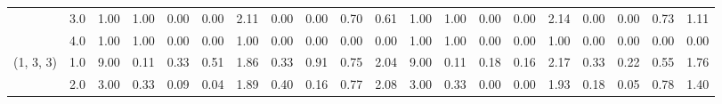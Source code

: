 \begin{tabular}{llrrrrrrrrrrrrrrrrrr}
          & 3.0 &               1.00 &                     1.00 &                                 0.00 &                             0.00 &                           2.11 &                                               0.00 &                                            0.00 &                                            0.70 &                                        0.61 &               1.00 &                     1.00 &                                 0.00 &                             0.00 &                           2.14 &                                               0.00 &                                            0.00 &                                            0.73 &                                        1.11 \\
          & 4.0 &               1.00 &                     1.00 &                                 0.00 &                             0.00 &                           1.00 &                                               0.00 &                                            0.00 &                                            0.00 &                                        0.00 &               1.00 &                     1.00 &                                 0.00 &                             0.00 &                           1.00 &                                               0.00 &                                            0.00 &                                            0.00 &                                        0.00 \\
(1, 3, 3) & 1.0 &               9.00 &                     0.11 &                                 0.33 &                             0.51 &                           1.86 &                                               0.33 &                                            0.91 &                                            0.75 &                                        2.04 &               9.00 &                     0.11 &                                 0.18 &                             0.16 &                           2.17 &                                               0.33 &                                            0.22 &                                            0.55 &                                        1.76 \\
          & 2.0 &               3.00 &                     0.33 &                                 0.09 &                             0.04 &                           1.89 &                                               0.40 &                                            0.16 &                                            0.77 &                                        2.08 &               3.00 &                     0.33 &                                 0.00 &                             0.00 &                           1.93 &                                               0.18 &                                            0.05 &                                            0.78 &                                        1.40 \\

\end{tabular}
